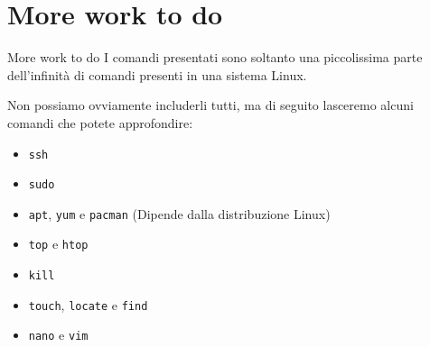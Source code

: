 \documentclass{beamer}
\begin{document}
\section{More work to do}
\begin{frame}{More work to do}
  I comandi presentati sono soltanto una piccolissima parte dell'infinità di 
  comandi presenti in una sistema Linux.\bigskip 

  Non possiamo ovviamente includerli tutti, ma di seguito lasceremo alcuni 
  comandi che potete approfondire:
  \begin{itemize}
    \item \texttt{ssh}
    \item \texttt{sudo}
    \item \texttt{apt}, \texttt{yum} e \texttt{pacman} (Dipende dalla 
      distribuzione Linux)
    \item \texttt{top} e \texttt{htop}
    \item \texttt{kill}
    \item \texttt{touch}, \texttt{locate} e  \texttt{find} 
    \item \texttt{nano} e \texttt{vim}
  \end{itemize}
\end{frame}
    
\end{document}
